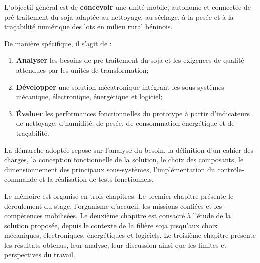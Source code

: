 L’objectif général est de \textbf{concevoir} une unité mobile, autonome et connectée de pré-traitement du soja adaptée au nettoyage, au séchage, à la pesée et à la traçabilité numérique des lots en milieu rural béninois.

De manière spécifique, il s’agit de :
\begin{enumerate}
    \item \textbf{Analyser} les besoins de pré-traitement du soja et les exigences de qualité attendues par les unités de transformation;
    \item \textbf{Développer} une solution mécatronique intégrant les sous-systèmes mécanique, électronique, énergétique et logiciel;
    \item \textbf{Évaluer} les performances fonctionnelles du prototype à partir d’indicateurs de nettoyage, d’humidité, de pesée, de consommation énergétique et de traçabilité.
\end{enumerate}

La démarche adoptée repose sur l’analyse du besoin, la définition d’un cahier des charges, la conception fonctionnelle de la solution, le choix des composants, le dimensionnement des principaux sous-systèmes, l’implémentation du contrôle-commande et la réalisation de tests fonctionnels.

Le mémoire est organisé en trois chapitres. Le premier chapitre présente le déroulement du stage, l’organisme d’accueil, les missions confiées et les compétences mobilisées. Le deuxième chapitre est consacré à l’étude de la solution proposée, depuis le contexte de la filière soja jusqu’aux choix mécaniques, électroniques, énergétiques et logiciels. Le troisième chapitre présente les résultats obtenus, leur analyse, leur discussion ainsi que les limites et perspectives du travail.
\newpage
